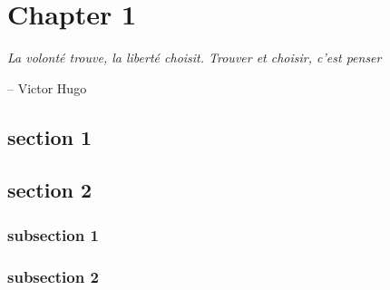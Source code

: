 \chapter{Chapter 1}
\epigraph{\itshape  La volonté trouve, la liberté choisit. Trouver et choisir, c'est penser}{-- Victor Hugo}

\startcontents[chapters]
\printmyminitoc{
	\lipsum[1]
}

\section{section 1}

\lipsum[1] \cite{imagenet_cvpr09}

\lipsum[1] \cite{KrizhevskySH12}

\section{section 2}
\lipsum[2]

\subsection{subsection 1}
\lipsum[1]
\subsection{subsection 2}
\lipsum[1]